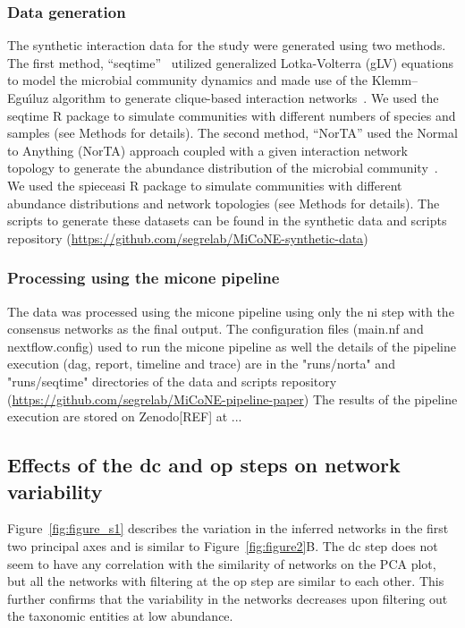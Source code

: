     \subsubsection*{Data generation}
    The synthetic interaction data for the study were generated using two methods.
    The first method, ``seqtime''~\cite{faustSignaturesEcologicalProcesses2018} utilized generalized Lotka-Volterra (gLV) equations to model the microbial community dynamics and made use of the Klemm–Eguı́luz algorithm to generate clique-based interaction networks~\cite{Rottjers2018}.
    We used the seqtime R package to simulate communities with different numbers of species and samples (see Methods for details).
    The second method, ``NorTA'' used the Normal to Anything (NorTA) approach coupled with a given interaction network topology to generate the abundance distribution of the microbial community~\cite{Kurtz2015}.
    We used the spieceasi R package to simulate communities with different abundance distributions and network topologies (see Methods for details).
    The scripts to generate these datasets can be found in the synthetic data and scripts repository (\href{https://github.com/segrelab/MiCoNE-synthetic-data}{https://github.com/segrelab/MiCoNE-synthetic-data})

    \subsubsection*{Processing using the \ac{micone} pipeline}
    The data was processed using the \ac{micone} pipeline using only the \ac{ni} step with the consensus networks as the final output.
    The configuration files (main.nf and nextflow.config) used to run the \ac{micone} pipeline as well the details of the pipeline execution (dag, report, timeline and trace) are in the "runs/norta" and "runs/seqtime" directories of the data and scripts repository (\href{https://github.com/segrelab/MiCoNE-pipeline-paper}{https://github.com/segrelab/MiCoNE-pipeline-paper})
    The results of the pipeline execution are stored on Zenodo[REF] at ...

  \subsection*{Effects of the \ac{dc} and \ac{op} steps on network variability}

    Figure~\ref{fig:figure_s1} describes the variation in the inferred networks in the first two principal axes and is similar to Figure~\ref{fig:figure2}B.
    The \ac{dc} step does not seem to have any correlation with the similarity of networks on the PCA plot, but all the networks with filtering at the \ac{op} step are similar to each other.
    This further confirms that the variability in the networks decreases upon filtering out the taxonomic entities at low abundance.

